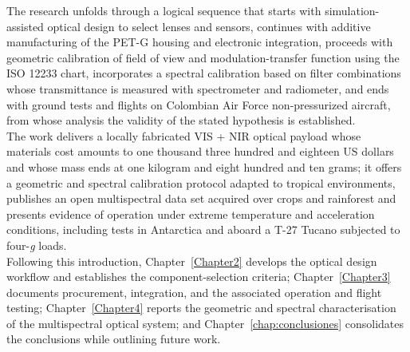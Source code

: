 \noindent The research unfolds through a logical sequence that starts with
simulation-assisted optical design to select lenses and sensors,
continues with additive manufacturing of the PET-G housing and
electronic integration, proceeds with geometric calibration of field of
view and modulation-transfer function using the ISO 12233 chart,
incorporates a spectral calibration based on filter combinations whose
transmittance is measured with spectrometer and radiometer, and ends
with ground tests and flights on Colombian Air Force non-pressurized aircraft, from
whose analysis the validity of the stated hypothesis is established.\\

\noindent The work delivers a locally fabricated VIS + NIR optical payload whose
materials cost amounts to one thousand three hundred and eighteen US
dollars and whose mass ends at one kilogram and eight hundred and ten
grams; it offers a geometric and spectral calibration protocol adapted
to tropical environments, publishes an open multispectral data set
acquired over crops and rainforest and presents evidence of operation
under extreme temperature and acceleration conditions, including tests
in Antarctica and aboard a T-27 Tucano subjected to four-\emph{g}
loads.\\

\noindent Following this introduction, Chapter~\ref{Chapter2} develops the optical design workflow and establishes the component-selection criteria; Chapter~\ref{Chapter3} documents procurement, integration, and the associated operation and flight testing; Chapter~\ref{Chapter4} reports the geometric and spectral characterisation of the multispectral optical system; and Chapter~\ref{chap:conclusiones} consolidates the conclusions while outlining future work.\\







